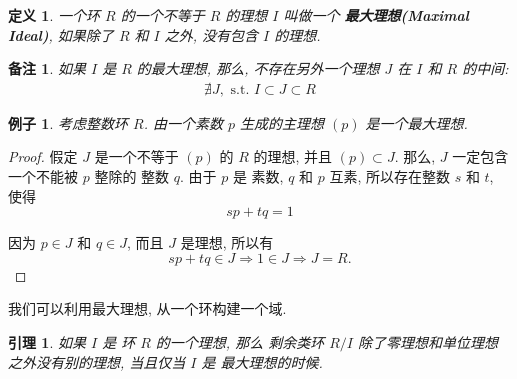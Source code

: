 \documentclass[utf8]{ctexbook}
\newtheorem{definition}{定义}[section]
\newtheorem{memo}{备注}[section]
\newtheorem{example}{例子}[section]
\newtheorem{lemma}{引理}[section]
\begin{document}
\begin{definition}
一个环 $R$ 的一个不等于 $R$ 的理想 $I$ 叫做一个 \textbf{最大理想(Maximal Ideal)}, 如果除了 $R$ 和 $I$ 之外, 没有包含 $I$ 的理想.
\end{definition}

\begin{memo}\label{memo_maximal_ideal}
如果 $I$ 是 $R$ 的最大理想, 那么, 不存在另外一个理想 $J$ 在 $I$ 和 $R$ 的中间: 
\begin{align*}
\nexists J, \mbox{ s.t. } I \subset J \subset R
\end{align*}
\end{memo}

\begin{example}\label{example_prime_number_max_ideal}
考虑整数环 $R$. 由一个素数 $p$ 生成的主理想 $(p)$ 是一个最大理想. 

\end{example}

\begin{proof}
假定 $J$ 是一个不等于 $(p)$ 的 $R$ 的理想, 并且 $(p) \subset J$. 那么, $J$ 一定包含一个不能被 $p$ 整除的 整数 $q$. 由于 $p$ 是 素数, $q$ 和 $p$ 互素, 所以存在整数 $s$ 和 $t$, 使得
\begin{equation}
 s p + t q = 1 \nonumber
\end{equation} 

因为 $p \in J$ 和 $q \in J$, 而且 $J$ 是理想, 所以有
\begin{equation}
s p + t q \in J \Longrightarrow 1 \in J \Longrightarrow J = R . \nonumber
\end{equation} 

\end{proof}

我们可以利用最大理想, 从一个环构建一个域.


\begin{lemma}\label{lemma_max_ideal_quotient_ring}
如果 $I$ 是 环 $R$ 的一个理想, 那么 剩余类环 $R/I$ 除了零理想和单位理想之外没有别的理想, 当且仅当 $I$ 是 最大理想的时候.
\end{lemma}
\end{document}
